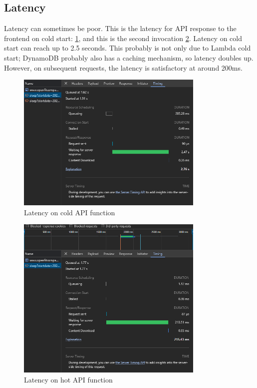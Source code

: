 \subsection{Latency}
Latency can sometimes be poor. This is the latency for API response to the frontend on cold start: \ref{fig:latencyBad}, and this is the second invocation \ref{fig:latencyGood}. Latency on cold start can reach up to 2.5 seconds. This probably is not only due to Lambda cold start; DynamoDB probably also has a caching mechanism, so latency doubles up. However, on subsequent requests, the latency is satisfactory at around 200ms.   
\begin{figure}
    
    \centering
    \includegraphics[width=0.8\textwidth,keepaspectratio]{../images/latencyBad.png}
    \caption{Latency on cold API function}
    \label{fig:latencyBad}
    
\end{figure}
\begin{figure}
    
    \centering
    \includegraphics[width=0.8\textwidth,keepaspectratio]{../images/latencyGood.png}
    \caption{Latency on hot API function}
    \label{fig:latencyGood}
    
\end{figure}

